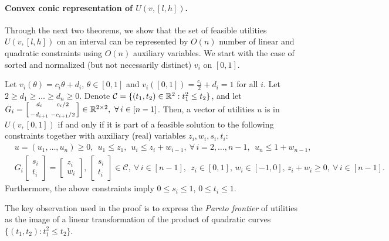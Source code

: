 \paragraph{Convex conic representation of $U(v,[l,h])$.} 
Through the next two theorems, we show that the set of feasible utilities $U(v, [l,h])$ on an interval can be represented by $O(n)$ number of linear and quadratic constraints using $O(n)$ auxiliary variables.
We start with the case of sorted and normalized (but not necessarily distinct) $v_i$ on $[0,1]$.
\begin{theorem}
	Let $v_i(\theta) = c_i \theta + d_i$, $\theta\in [0,1]$ and $v_i([0,1]) = \frac{c_i}{2}+d_i = 1$ for all $i$. 
	Let $2\geq d_1 \geq \dots \geq d_n \geq 0$. 
	Denote $\mathcal{C} = \{ (t_1,t_2)\in \mathbb{R}^2: t_1^2 \leq t_2 \}$, and let
	$G_i = \left[ \begin{smallmatrix}
		d_i & c_i / 2 \\[1ex]
		-d_{i+1} & -c_{i+1}/2
 	\end{smallmatrix}\right]\in \mathbb{R}^{2\times 2},\ \forall\, i\in [n-1]$.
	Then, a vector of utilities $u$ is in $U(v, [0,1])$ if and only if it is part of a feasible solution to the following constraints together with auxiliary (real) variables $z_i, w_i, s_i, t_i$:
	\begin{align*}
		& u = (u_1, \dots, u_n) \geq 0, \ \ u_1 \leq z_1, \ \ u_i \leq z_i + w_{i-1},\ \forall\, i=2, \dots, n-1,\ \ u_n \leq 1 + w_{n-1},\\
		& G_i \left[\begin{smallmatrix}
			s_i \\ t_i
		\end{smallmatrix}\right] = \left[ \begin{smallmatrix}
			z_i \\ w_i
		\end{smallmatrix}\right], \, \left[\begin{smallmatrix}
			s_i \\ t_i
		\end{smallmatrix}\right] \in \mathcal{C},\ \forall\, i \in [n-1],\ \ z_i \in [0,1],\, w_i \in [-1,0],\, z_i + w_i \geq 0,\ \forall\, i\in [n-1].
	\end{align*} 
	Furthermore, the above constraints imply $0\leq s_i \leq 1$, $0\leq t_i \leq 1$.
	\label{thm:U-conic-rep}
\end{theorem}
The key observation used in the proof is to express the \emph{Pareto frontier} of utilities as the image of a linear transformation of the product of quadratic curves $\{(t_1, t_2): t_1^2 \leq t_2\}$.

